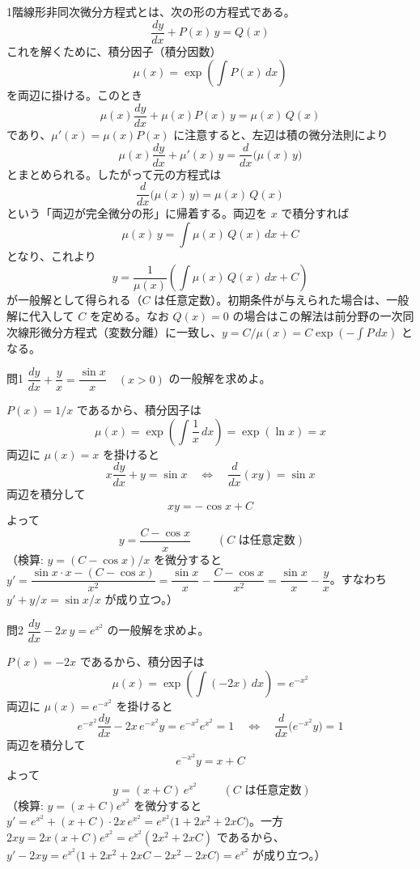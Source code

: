 \documentclass[a4paper,11pt]{article}
\begin{document}


\noindent
1階線形非同次微分方程式とは、次の形の方程式である。
\[
\frac{dy}{dx} + P(x)\,y = Q(x)
\]
これを解くために、積分因子（積分因数）
\[
\mu(x) = \exp\left(\int P(x)\,dx\right)
\]
を両辺に掛ける。このとき
\[
\mu(x)\frac{dy}{dx} + \mu(x) P(x)\,y = \mu(x)\,Q(x)
\]
であり、$\mu'(x) = \mu(x) P(x)$ に注意すると、左辺は積の微分法則により
\[
\mu(x)\frac{dy}{dx} + \mu'(x)\,y = \frac{d}{dx}\bigl(\mu(x)\,y\bigr)
\]
とまとめられる。したがって元の方程式は
\[
\frac{d}{dx}\bigl(\mu(x)\,y\bigr) = \mu(x)\,Q(x)
\]
という「両辺が完全微分の形」に帰着する。両辺を $x$ で積分すれば
\[
\mu(x)\,y = \int \mu(x)\,Q(x)\,dx + C
\]
となり、これより
\[
y = \frac{1}{\mu(x)}\left(\int \mu(x)\,Q(x)\,dx + C\right)
\]
が一般解として得られる（$C$ は任意定数）。初期条件が与えられた場合は、一般解に代入して $C$ を定める。なお $Q(x) = 0$ の場合はこの解法は前分野の一次同次線形微分方程式（変数分離）に一致し、$y = C/\mu(x) = C\exp\left(-\int P\,dx\right)$ となる。

\clearpage
\begin{mondaiboxS}{問1}
$\dfrac{dy}{dx} + \dfrac{y}{x} = \dfrac{\sin x}{x} \quad (x > 0)$ の一般解を求めよ。
\end{mondaiboxS}
\kaitou
$P(x) = 1/x$ であるから、積分因子は
\[
\mu(x) = \exp\left(\int \frac{1}{x}\,dx\right) = \exp(\ln x) = x
\]
両辺に $\mu(x) = x$ を掛けると
\[
x\frac{dy}{dx} + y = \sin x
\quad\Longleftrightarrow\quad
\frac{d}{dx}(xy) = \sin x
\]
両辺を積分して
\[
xy = -\cos x + C
\]
よって
\[
\boxed{\; y = \frac{C - \cos x}{x} \;}
\qquad (C \text{ は任意定数})
\]
（検算: $y = (C-\cos x)/x$ を微分すると $y' = \dfrac{\sin x \cdot x - (C-\cos x)}{x^{2}} = \dfrac{\sin x}{x} - \dfrac{C-\cos x}{x^{2}} = \dfrac{\sin x}{x} - \dfrac{y}{x}$。すなわち $y' + y/x = \sin x / x$ が成り立つ。）

\clearpage
\begin{mondaiboxS}{問2}
$\dfrac{dy}{dx} - 2x\,y = e^{x^{2}}$ の一般解を求めよ。
\end{mondaiboxS}
\kaitou
$P(x) = -2x$ であるから、積分因子は
\[
\mu(x) = \exp\left(\int (-2x)\,dx\right) = e^{-x^{2}}
\]
両辺に $\mu(x) = e^{-x^{2}}$ を掛けると
\[
e^{-x^{2}}\frac{dy}{dx} - 2x\,e^{-x^{2}}y = e^{-x^{2}}e^{x^{2}} = 1
\quad\Longleftrightarrow\quad
\frac{d}{dx}\bigl(e^{-x^{2}}y\bigr) = 1
\]
両辺を積分して
\[
e^{-x^{2}}y = x + C
\]
よって
\[
\boxed{\; y = (x + C)\,e^{x^{2}} \;}
\qquad (C \text{ は任意定数})
\]
（検算: $y = (x+C)e^{x^{2}}$ を微分すると $y' = e^{x^{2}} + (x+C)\cdot 2x\,e^{x^{2}} = e^{x^{2}}\bigl(1 + 2x^{2} + 2xC\bigr)$。一方 $2xy = 2x(x+C)e^{x^{2}} = e^{x^{2}}(2x^{2}+2xC)$ であるから、$y' - 2xy = e^{x^{2}}\bigl(1+2x^{2}+2xC-2x^{2}-2xC\bigr) = e^{x^{2}}$ が成り立つ。）
\end{document}
